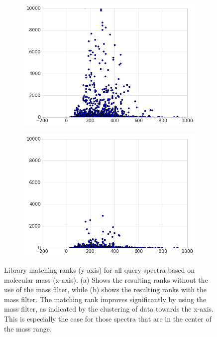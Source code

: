 \begin{figure}[h]
    \centering
    \begin{subfigure}[b]{0.48\linewidth}
        \includegraphics[width=\linewidth]{./mass_prediction_rank.png}
        \caption{}
    \end{subfigure}
    \begin{subfigure}[b]{0.48\linewidth}
        \includegraphics[width=\linewidth]{./mass_prediction_rank_mass_filter.png}
        \caption{}
    \end{subfigure}
    \caption[Ranks with and without mass filter]{
    Library matching ranks (y-axis) for all query spectra based on molecular mass (x-axis).
    (a) Shows the resulting ranks without the use of the mass filter, while (b) shows the resulting ranks with the mass filter.
    The matching rank improves significantly by using the mass filter, as indicated by the clustering of data towards the x-axis.
    This is especially the case for those spectra that are in the center of the mass range.}
    \label{fig:similarity_scatter_plots}
\end{figure}

